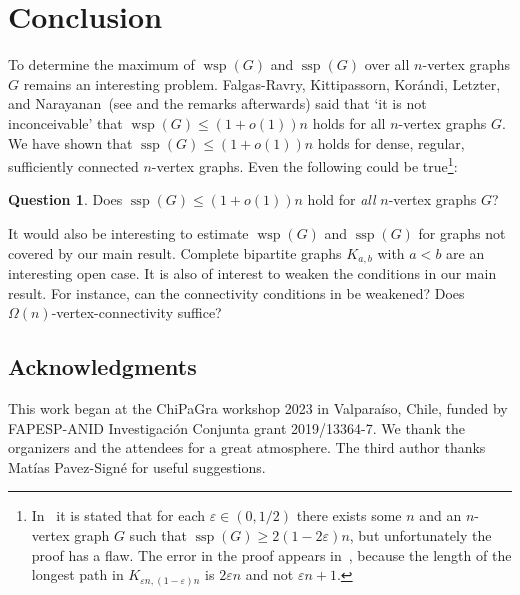 \documentclass[a4paper, 11pt,reqno]{amsart}
\theoremstyle{plain}
\theoremstyle{definition}
\newtheorem{question}[theorem]{Question}
\numberwithin{equation}{section}
\DeclareMathOperator{\wsp}{wsp}
\DeclareMathOperator{\ssp}{ssp}
\newcommand{\eps}{\varepsilon}
\begin{document}
%
%

\section{Conclusion} \label{section:conclusion}

To determine the maximum of $\wsp(G)$ and $\ssp(G)$ over all
$n$-vertex graphs $G$ remains an interesting problem. Falgas-Ravry,
Kittipassorn, Korándi, Letzter, and Narayanan\ (see \cite[Conjecture
1.2]{FKKLN2014} and the remarks afterwards) said that `it is not
inconceivable' that $\wsp(G) \leq (1 + o(1))n$ holds for all
$n$-vertex graphs $G$.  We have shown that $\ssp(G) \leq (1 + o(1))n$
holds for dense, regular, sufficiently connected $n$-vertex graphs.
Even the following could be
true\footnote{In~\cite[Theorem~10]{BCMP2016} it is stated that for
  each $\eps \in (0, 1/2)$ there exists some $n$ and an $n$-vertex
  graph $G$ such that $\ssp(G) \geq 2(1 - 2 \eps)n$, but unfortunately
  the proof has a flaw. The error in the proof appears
  in~\cite[Remark~10]{BCMP2016}, because the length of the longest
  path in $K_{\eps n, (1 - \eps)n}$ is $2 \eps n$ and not $\eps n +
  1$.}:

\begin{question}
	Does $\ssp(G) \leq (1 + o(1))n$ hold for \emph{all} $n$-vertex graphs $G$?
\end{question}

It would also be interesting to estimate $\wsp(G)$ and $\ssp(G)$ for
graphs not covered by our main result.  Complete bipartite graphs
$K_{a,b}$ with $a < b$ are an interesting open case.  It is also of
interest to weaken the conditions in our main result. For instance,
can the connectivity conditions in  be weakened?
Does $\Omega(n)$-vertex-connectivity suffice?

\subsection*{Acknowledgments}
This work began at the ChiPaGra workshop 2023 in Valparaíso, Chile,
funded by FAPESP-ANID Investigación Conjunta grant 2019/13364-7.
We thank the organizers and the attendees for a great atmosphere.
The third author thanks Matías Pavez-Signé for useful suggestions.

\sloppy\printbibliography
\end{document}
